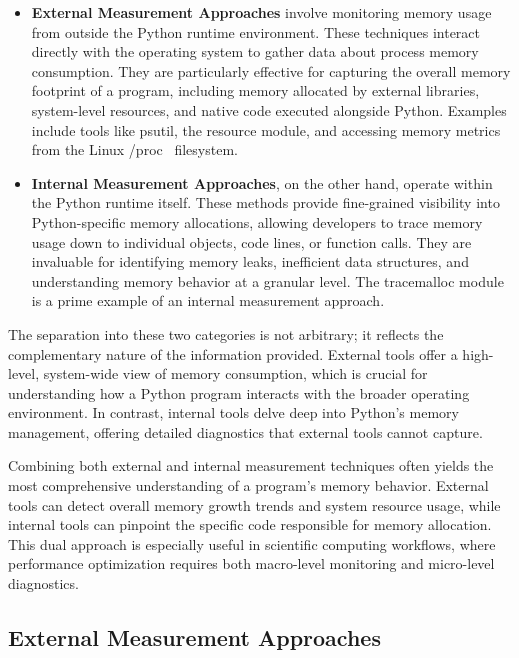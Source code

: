 \begin{itemize}
    \item \textbf{External Measurement Approaches} involve monitoring memory usage from outside the Python runtime environment.
    These techniques interact directly with the operating system to gather data about process memory consumption.
    They are particularly effective for capturing the overall memory footprint of a program, including memory allocated by external libraries, system-level resources, and native code executed alongside Python.
    Examples include tools like psutil, the resource module, and accessing memory metrics from the Linux /proc~\cite{procfs} filesystem.

    \item \textbf{Internal Measurement Approaches}, on the other hand, operate within the Python runtime itself.
    These methods provide fine-grained visibility into Python-specific memory allocations, allowing developers to trace memory usage down to individual objects, code lines, or function calls.
    They are invaluable for identifying memory leaks, inefficient data structures, and understanding memory behavior at a granular level.
    The tracemalloc module is a prime example of an internal measurement approach.
\end{itemize}

The separation into these two categories is not arbitrary; it reflects the complementary nature of the information provided.
External tools offer a high-level, system-wide view of memory consumption, which is crucial for understanding how a Python program interacts with the broader operating environment.
In contrast, internal tools delve deep into Python’s memory management, offering detailed diagnostics that external tools cannot capture.

Combining both external and internal measurement techniques often yields the most comprehensive understanding of a program’s memory behavior.
External tools can detect overall memory growth trends and system resource usage, while internal tools can pinpoint the specific code responsible for memory allocation.
This dual approach is especially useful in scientific computing workflows, where performance optimization requires both macro-level monitoring and micro-level diagnostics.

\subsection{External Measurement Approaches}
\label{subsec:mmc-external-measurement-approaches}

